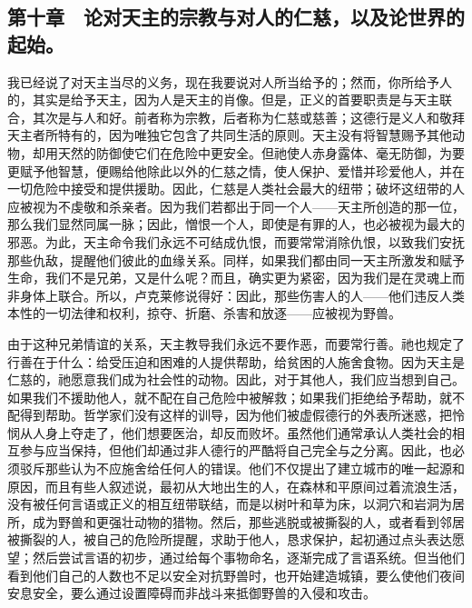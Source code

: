 
\subsection{第十章　论对天主的宗教与对人的仁慈，以及论世界的起始。}

我已经说了对天主当尽的义务，现在我要说对人所当给予的；然而，你所给予人的，其实是给予天主，因为人是天主的肖像。但是，正义的首要职责是与天主联合，其次是与人和好。前者称为宗教，后者称为仁慈或慈善；这德行是义人和敬拜天主者所特有的，因为唯独它包含了共同生活的原则。天主没有将智慧赐予其他动物，却用天然的防御使它们在危险中更安全。但祂使人赤身露体、毫无防御，为要更赋予他智慧，便赐给他除此以外的仁慈之情，使人保护、爱惜并珍爱他人，并在一切危险中接受和提供援助。因此，仁慈是人类社会最大的纽带；破坏这纽带的人应被视为不虔敬和杀亲者。因为我们若都出于同一个人——天主所创造的那一位，那么我们显然同属一脉；因此，憎恨一个人，即使是有罪的人，也必被视为最大的邪恶。为此，天主命令我们永远不可结成仇恨，而要常常消除仇恨，以致我们安抚那些仇敌，提醒他们彼此的血缘关系。同样，如果我们都由同一天主所激发和赋予生命，我们不是兄弟，又是什么呢？而且，确实更为紧密，因为我们是在灵魂上而非身体上联合。所以，卢克莱修说得好：因此，那些伤害人的人——他们违反人类本性的一切法律和权利，掠夺、折磨、杀害和放逐——应被视为野兽。\par

由于这种兄弟情谊的关系，天主教导我们永远不要作恶，而要常行善。祂也规定了行善在于什么：给受压迫和困难的人提供帮助，给贫困的人施舍食物。因为天主是仁慈的，祂愿意我们成为社会性的动物。因此，对于其他人，我们应当想到自己。如果我们不援助他人，就不配在自己危险中被解救；如果我们拒绝给予帮助，就不配得到帮助。哲学家们没有这样的训导，因为他们被虚假德行的外表所迷惑，把怜悯从人身上夺走了，他们想要医治，却反而败坏。虽然他们通常承认人类社会的相互参与应当保持，但他们却通过非人德行的严酷将自己完全与之分离。因此，也必须驳斥那些认为不应施舍给任何人的错误。他们不仅提出了建立城市的唯一起源和原因，而且有些人叙述说，最初从大地出生的人，在森林和平原间过着流浪生活，没有被任何言语或正义的相互纽带联结，而是以树叶和草为床，以洞穴和岩洞为居所，成为野兽和更强壮动物的猎物。然后，那些逃脱或被撕裂的人，或者看到邻居被撕裂的人，被自己的危险所提醒，求助于他人，恳求保护，起初通过点头表达愿望；然后尝试言语的初步，通过给每个事物命名，逐渐完成了言语系统。但当他们看到他们自己的人数也不足以安全对抗野兽时，也开始建造城镇，要么使他们夜间安息安全，要么通过设置障碍而非战斗来抵御野兽的入侵和攻击。\par

